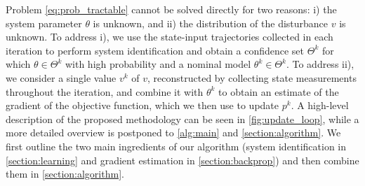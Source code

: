 \documentclass[journal,twoside,web,final]{ieeecolor}
\theoremstyle{definition}
\newcommand{\eb}[1]{\textcolor{blue}{#1}}
\begin{document}
Problem \cref{eq:prob_tractable} cannot be solved directly for two reasons: i) the system parameter $\theta$ is unknown, and ii) the distribution of the disturbance $v$ is unknown. 
To address i), we use the state-input trajectories collected in each iteration to perform system identification and obtain a confidence set $\Theta^k$ for which $\theta\in \Theta^k$ with high probability and a nominal model $\theta^k\in\Theta^k$. 
To address ii), we consider a single value $v^k$ of $v$, reconstructed by collecting state measurements throughout the iteration, and combine it with $\theta^k$ to obtain an estimate of the gradient of the objective function, which we then use to update $p^k$. 
A high-level description of the proposed methodology can be seen in \cref{fig:update_loop}, 
while a more detailed overview is postponed to \cref{alg:main} and \cref{section:algorithm}.
We first outline the two main ingredients of our algorithm (system identification in \cref{section:learning} and gradient estimation in \cref{section:backprop}) and then combine them in \cref{section:algorithm}.
\end{document}
